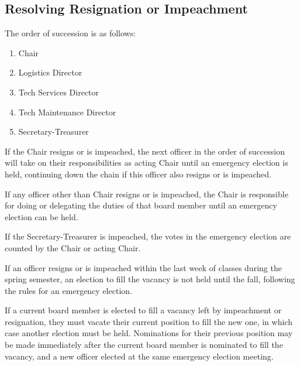 	\subsection {Resolving Resignation or Impeachment}

The order of succession is as follows:
\begin{enumerate}
	\item Chair
	\item Logistics Director
	\item Tech Services Director
	\item Tech Maintenance Director
	\item Secretary-Treasurer
\end{enumerate}

If the Chair resigns or is impeached, the next officer in the order of succession will take on their responsibilities as acting Chair until an emergency election is held, continuing down the chain if this officer also resigns or is impeached.

If any officer other than Chair resigns or is impeached, the Chair is responsible for doing or delegating the duties of that board member until an emergency election can be held.

If the Secretary-Treasurer is impeached, the votes in the emergency election are counted by the Chair or acting Chair.

If an officer resigns or is impeached within the last week of classes during the spring semester, an election to fill the vacancy is not held until the fall, following the rules for an emergency election.

If a current board member is elected to fill a vacancy left by impeachment or resignation, they must vacate their current position to fill the new one, in which case another election must be held. Nominations for their previous position may be made immediately after the current board member is nominated to fill the vacancy, and a new officer elected at the same emergency election meeting.
